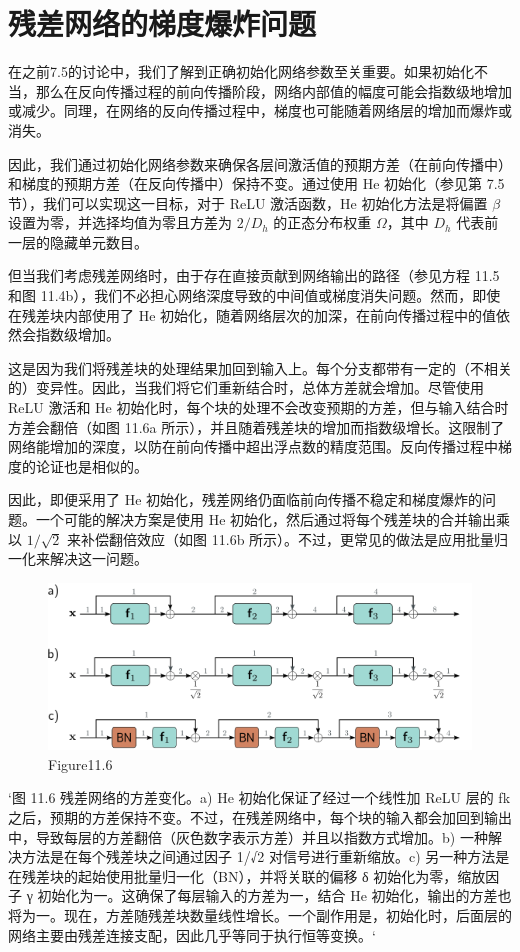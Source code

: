 \section{残差网络的梯度爆炸问题}
在之前7.5的讨论中，我们了解到正确初始化网络参数至关重要。如果初始化不当，那么在反向传播过程的前向传播阶段，网络内部值的幅度可能会指数级地增加或减少。同理，在网络的反向传播过程中，梯度也可能随着网络层的增加而爆炸或消失。

因此，我们通过初始化网络参数来确保各层间激活值的预期方差（在前向传播中）和梯度的预期方差（在反向传播中）保持不变。通过使用 He 初始化（参见第 7.5 节），我们可以实现这一目标，对于 ReLU 激活函数，He 初始化方法是将偏置 \(\beta\) 设置为零，并选择均值为零且方差为 \(2/D_h\) 的正态分布权重 \(\Omega\)，其中 \(D_h\) 代表前一层的隐藏单元数目。

但当我们考虑残差网络时，由于存在直接贡献到网络输出的路径（参见方程 11.5 和图 11.4b），我们不必担心网络深度导致的中间值或梯度消失问题。然而，即使在残差块内部使用了 He 初始化，随着网络层次的加深，在前向传播过程中的值依然会指数级增加。

这是因为我们将残差块的处理结果加回到输入上。每个分支都带有一定的（不相关的）变异性。因此，当我们将它们重新结合时，总体方差就会增加。尽管使用 ReLU 激活和 He 初始化时，每个块的处理不会改变预期的方差，但与输入结合时方差会翻倍（如图 11.6a 所示），并且随着残差块的增加而指数级增长。这限制了网络能增加的深度，以防在前向传播中超出浮点数的精度范围。反向传播过程中梯度的论证也是相似的。

因此，即便采用了 He 初始化，残差网络仍面临前向传播不稳定和梯度爆炸的问题。一个可能的解决方案是使用 He 初始化，然后通过将每个残差块的合并输出乘以 \(1/\sqrt{2}\) 来补偿翻倍效应（如图 11.6b 所示）。不过，更常见的做法是应用批量归一化来解决这一问题。

\begin{figure}[h!]
\centering
\includegraphics[width=0.7\linewidth]{png/chapter11/ResidualVariance.png}
\caption{Figure11.6}
\end{figure}

`图 11.6 残差网络的方差变化。a) He 初始化保证了经过一个线性加 ReLU 层的 fk 之后，预期的方差保持不变。不过，在残差网络中，每个块的输入都会加回到输出中，导致每层的方差翻倍（灰色数字表示方差）并且以指数方式增加。b) 一种解决方法是在每个残差块之间通过因子 1/√2 对信号进行重新缩放。c) 另一种方法是在残差块的起始使用批量归一化（BN），并将关联的偏移 δ 初始化为零，缩放因子 γ 初始化为一。这确保了每层输入的方差为一，结合 He 初始化，输出的方差也将为一。现在，方差随残差块数量线性增长。一个副作用是，初始化时，后面层的网络主要由残差连接支配，因此几乎等同于执行恒等变换。`

